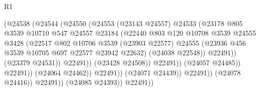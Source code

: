\begin{lexlean}{R1}
\begin{coremodule}
                                      (@24538
                                        (@24544
                                          (@24550
                                            (@24553
                                              (@23143 @24557)
                                              @24533
                                              (@23178
                                                @805
                                                @3539
                                                @10710
                                                @547
                                                @24557
                                                @23184
                                                (@22440
                                                  @803
                                                  @120
                                                  @10708
                                                  @3539
                                                  @24555
                                                  @3428
                                                  (@22517
                                                    @802
                                                    @10706
                                                    @3539
                                                    (@23903 @22577)
                                                    @24555
                                                    (@23936
                                                      @456
                                                      @3539
                                                      @10705
                                                      @697
                                                      @22577
                                                      @23942
                                                      @22632)
                                                    (@24038 @22548))
                                                  @22491))
                                              (@23379 @24531))
                                            @22491))
                                        (@23428 @24508))
                                      @22491))
                                  (@24057 @24485))
                                @22491))
                            (@24064 @24462))
                          @22491))
                      (@24071 @24439))
                    @22491))
                (@24078 @24416))
              @22491))
          (@24085 @24393))
        @22491))

\end{coremodule}
\end{lexlean}
